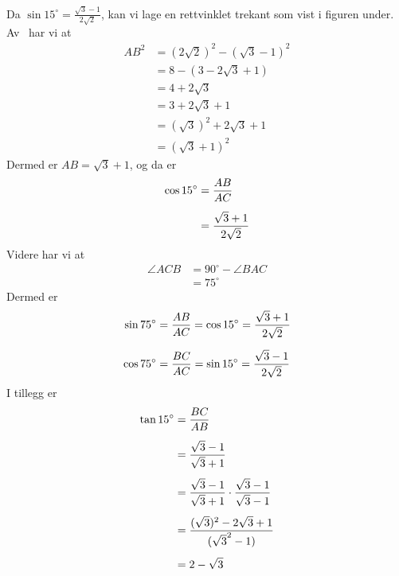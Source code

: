 \newpage
{}
Da $\sin 15^\circ =\frac{\sqrt{3}-1}{2\sqrt{2}}$, kan vi lage en rettvinklet trekant som vist i figuren under.
Av \pyt\ har vi at
\begin{align*}
	AB^2 &= (2\sqrt{2})^2-(\sqrt{3}-1)^2 \\
	&= 8-(3-2\sqrt{3}+1) \\
	&= 4+2\sqrt{3} \\
	&= 3+2\sqrt{3}+1 \\
	&= (\sqrt{3})^2+2\sqrt{3}+1 \\
	&= (\sqrt{3}+1)^2
\end{align*}
Dermed er $AB=\sqrt{3}+1$, og da er 
\begin{align*}
	\cos 15^\circ &= \frac{AB}{AC} \br
	&= \frac{\sqrt{3}+1}{2\sqrt{2}}
\end{align*}
Videre har vi at
\begin{align*}
	\angle ACB&=90^\circ-\angle BAC \\
	&= 75^\circ 
\end{align*}
Dermed er
\begin{align*}
	\sin 75^\circ &= \frac{AB}{AC} = \cos 15^\circ =\frac{\sqrt{3}+1}{2\sqrt{2}} \vn
	\cos 75^\circ &= \frac{BC}{AC}=\sin 15^\circ=\frac{\sqrt{3}-1}{2\sqrt{2}}
\end{align*}
I tillegg er
\begin{align*}
	\tan 15^\circ &= \frac{BC}{AB} \br
	&= \frac{\sqrt{3}-1}{\sqrt{3}+1} \br
	&= \frac{\sqrt{3}-1}{\sqrt{3}+1}\cdot\frac{\sqrt{3}-1}{\sqrt{3}-1} \br
	&= \frac{(\sqrt{3})^2-2\sqrt{3}+1}{(\sqrt{3}^2-1)} \br
	&= 2-\sqrt{3}
\end{align*}

\newpage
{}


